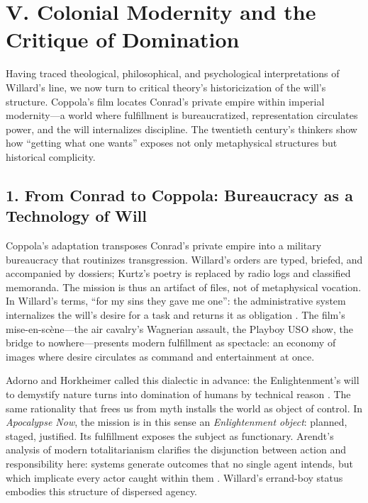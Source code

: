 
\section*{V. Colonial Modernity and the Critique of Domination}
\label{sec:v-colonial-modernity}

Having traced theological, philosophical, and psychological interpretations of Willard's line, 
we now turn to critical theory's historicization of the will's structure. Coppola's film 
locates Conrad's private empire within imperial modernity—a world where fulfillment is 
bureaucratized, representation circulates power, and the will internalizes discipline. The 
twentieth century's thinkers show how ``getting what one wants'' exposes not only metaphysical 
structures but historical complicity.

\subsection*{1. From Conrad to Coppola: Bureaucracy as a Technology of Will}
\label{ssec:1-from-conrad-to-coppola-bureaucracy-as-a-technology-of-will}
Coppola's adaptation transposes Conrad's private empire into a military bureaucracy that 
routinizes transgression. Willard's orders are typed, briefed, and accompanied by dossiers; 
Kurtz's poetry is replaced by radio logs and classified memoranda. The mission is thus an 
artifact of files, not of metaphysical vocation. In Willard's terms, ``for my sins they gave me 
one'': the administrative system internalizes the will's desire for a task and returns it as 
obligation \parencite{CoppolaApocalypse1979}. The film's mise-en-scène---the air cavalry's 
Wagnerian assault, the Playboy USO show, the bridge to nowhere---presents modern fulfillment as 
spectacle: an economy of images where desire circulates as command and entertainment at once.

Adorno and Horkheimer called this dialectic in advance: the Enlightenment's will to demystify 
nature turns into domination of humans by technical reason \parencite{AdornoHorkheimer2002}. 
The same rationality that frees us from myth installs the world as object of control. In 
\textit{Apocalypse Now}, the mission is in this sense an \emph{Enlightenment object}: planned, 
staged, justified. Its fulfillment exposes the subject as functionary. Arendt's analysis of 
modern totalitarianism clarifies the disjunction between action and responsibility here: systems 
generate outcomes that no single agent intends, but which implicate every actor caught within 
them \parencite{ArendtOrigins1973}. Willard's errand-boy status embodies this structure of 
dispersed agency.

